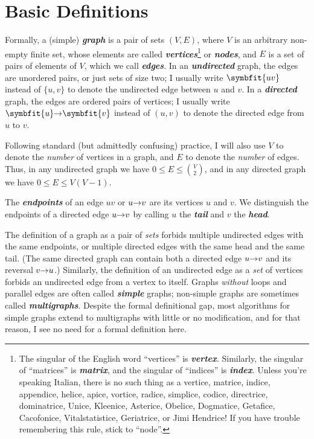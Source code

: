 \section{Basic Definitions}
\label{sec:5.2}

Formally, a (simple) \textbf{\textit{graph}} is a pair of sets $(V, E)$, where $V$ is an arbitrary non-empty finite set, whose elements are called \textbf{\textit{vertices}}\footnote{The singular of the English word “vertices” is \textbf{\textit{vertex}}. Similarly, the singular of “matrices” is \textbf{\textit{matrix}}, and the singular of “indices” is \textbf{\textit{index}}. Unless you’re speaking Italian, there is no such thing as a vertice, matrice, indice, appendice, helice, apice, vortice, radice, simplice, codice, directrice, dominatrice, Unice, Kleenice, Asterice, Obelice, Dogmatice, Getafice, Cacofonice, Vitalstatistice, Geriatrice, or Jimi Hendrice! If you have trouble remembering this rule, stick to “node”.} or \textbf{\textit{nodes}}, and $E$ is a set of pairs of elements of $V$, which we call \textbf{\textit{edges}}.
In an \textbf{\textit{undirected}} graph, the edges are unordered pairs, or just sets of size two; I usually write $\symbfit{uv}$ instead of $\{u, v\}$ to denote the undirected edge between $u$ and $v$.
In a \textbf{\textit{directed}} graph, the edges are ordered pairs of vertices; I usually write $\arc{\symbfit{u}}{\symbfit{v}}$ instead of $(u, v)$ to denote the directed edge from $u$ to $v$.

Following standard (but admittedly confusing) practice, I will also use $V$ to denote the \textit{number} of vertices in a graph, and $E$ to denote the \textit{number} of edges.
Thus, in any undirected graph we have $0 \le E \le \binom{V}{2}$, and in any directed graph we have $0 \le E \le V(V-1)$.

The \textbf{\textit{endpoints}} of an edge $uv$ or $u\mathord{\rightarrow}v$ are its vertices $u$ and $v$.
We distinguish the endpoints of a directed edge $u\mathord{\rightarrow}v$ by calling $u$ the \textbf{\textit{tail}} and $v$ the \textbf{\textit{head}}.

The definition of a graph as a pair of \textit{sets} forbids multiple undirected edges with the same endpoints, or multiple directed edges with the same head and the same tail.
(The same directed graph can contain both a directed edge $u\mathord{\rightarrow}v$ and its reversal $v\mathord{\rightarrow}u$.)
Similarly, the definition of an undirected edge as a \textit{set} of vertices forbids an undirected edge from a vertex to itself.
Graphs \textit{without} loops and parallel edges are often called \textbf{\textit{simple}} graphs; non-simple graphs are sometimes called \textbf{\textit{multigraphs}}.
Despite the formal definitional gap, most algorithms for simple graphs extend to multigraphs with little or no modification, and for that reason, I see no need for a formal definition here.

